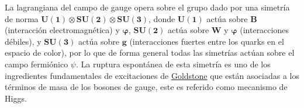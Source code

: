 La lagrangiana del campo de gauge opera sobre el grupo dado por una simetría de norma $\mathbf{U(1) \otimes SU(2) \otimes SU(3)}$, donde $\mathbf{U(1)}$ actúa sobre $\mathbf{B}$ (interacción electromagnética) y $\mathbf{\varphi}$, $\mathbf{SU(2)}$ actúa sobre $\mathbf{W}$ y $\mathbf{\varphi}$ (interacciones débiles), y $\mathbf{SU(3)}$ actúa sobre $\mathbf{g}$ (interacciones fuertes entre los quarks en el espacio de color), por lo que de forma general todas las simetrías actúan sobre el campo fermiónico $\psi$.
La ruptura espontánea de esta simetría es uno de los ingredientes fundamentales de excitaciones de \href{https://es.wikipedia.org/wiki/Bos\%C3\%B3n\_de\_Goldstone}{Goldstone} que están asociadas a los términos de masa de los bosones de gauge, este es referido como mecanismo de Higgs.



